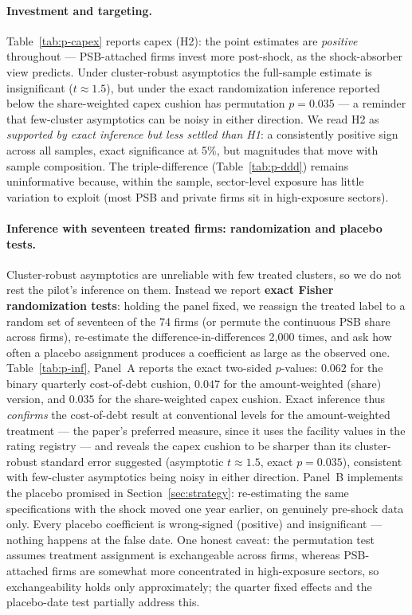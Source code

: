 \documentclass[12pt]{article}
\begin{document}
\paragraph{Investment and targeting.} Table~\ref{tab:p-capex} reports capex (H2): the point
estimates are \emph{positive} throughout --- PSB-attached firms invest more post-shock, as
the shock-absorber view predicts. Under cluster-robust asymptotics the full-sample estimate
is insignificant ($t\approx1.5$), but under the exact randomization inference reported below
the share-weighted capex cushion has permutation $p=0.035$ --- a reminder that few-cluster
asymptotics can be noisy in either direction. We read H2 as \emph{supported by exact
inference but less settled than H1}: a consistently positive sign across all samples, exact
significance at 5\%, but magnitudes that move with sample composition. The triple-difference (Table~\ref{tab:p-ddd}) remains
uninformative because, within the sample, sector-level exposure has little variation to
exploit (most PSB and private firms sit in high-exposure sectors).

\paragraph{Inference with seventeen treated firms: randomization and placebo tests.}
Cluster-robust asymptotics are unreliable with few treated clusters, so we do not rest the
pilot's inference on them. Instead we report \textbf{exact Fisher randomization tests}:
holding the panel fixed, we reassign the treated label to a random set of seventeen of the
74 firms (or permute the continuous PSB share across firms), re-estimate the
difference-in-differences 2{,}000 times, and ask how often a placebo assignment produces a
coefficient as large as the observed one. Table~\ref{tab:p-inf}, Panel~A reports the exact
two-sided $p$-values: $0.062$ for the binary quarterly cost-of-debt cushion, $\mathbf{0.047}$
for the amount-weighted (share) version, and $\mathbf{0.035}$ for the share-weighted capex
cushion. Exact inference thus \emph{confirms} the cost-of-debt result at conventional levels
for the amount-weighted treatment --- the paper's preferred measure, since it uses the
facility values in the rating registry --- and reveals the capex cushion to be sharper than
its cluster-robust standard error suggested (asymptotic $t\approx1.5$, exact $p=0.035$),
consistent with few-cluster asymptotics being noisy in either direction. Panel~B implements
the placebo promised in Section~\ref{sec:strategy}: re-estimating the same specifications
with the shock moved one year earlier, on genuinely pre-shock data only. Every placebo
coefficient is wrong-signed (positive) and insignificant --- nothing happens at the false
date. One honest caveat: the permutation test assumes treatment assignment is exchangeable
across firms, whereas PSB-attached firms are somewhat more concentrated in high-exposure
sectors, so exchangeability holds only approximately; the quarter fixed effects and the
placebo-date test partially address this.
\end{document}
